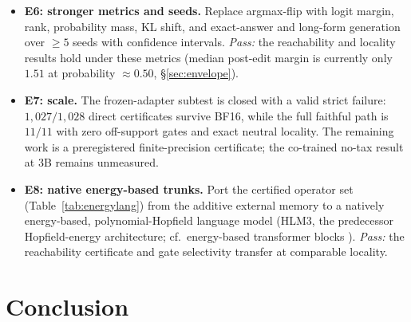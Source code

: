 \documentclass[10pt,twocolumn]{article}
\theoremstyle{remark}
\begin{document}
\begin{itemize}
  \citep{hartvigsen2023grace, wang2024wise, gu2026ultraedit}.
  \emph{Pass:} others-intact $\ge0.99$ with exact tombstone and rollback.
  \item \textbf{E6: stronger metrics and seeds.} Replace argmax-flip with logit
  margin, rank, probability mass, KL shift, and exact-answer and long-form
  generation \citep{rosati2024leme} over $\ge5$
  seeds with confidence intervals. \emph{Pass:} the reachability and locality
  results hold under these metrics (median post-edit margin is currently only
  $1.51$ at probability $\approx0.50$, \S\ref{sec:envelope}).
  \item \textbf{E7: scale.} The frozen-adapter subtest is closed with a valid
  strict failure: $1{,}027/1{,}028$ direct certificates survive BF16, while the
  full faithful path is $11/11$ with zero off-support gates and exact neutral
  locality. The remaining work is a preregistered finite-precision certificate;
  the co-trained no-tax result at $3$B remains unmeasured.
  \item \textbf{E8: native energy-based trunks.} Port the certified operator set
  (Table~\ref{tab:energylang}) from the additive external memory to a natively
  energy-based, polynomial-Hopfield language model (HLM3, the predecessor
  Hopfield-energy architecture; cf.\ energy-based
  transformer blocks \citep{hoover2023energy}). \emph{Pass:} the
  reachability certificate and gate selectivity transfer at comparable locality.
\end{itemize}

\section{Conclusion}
\end{document}
